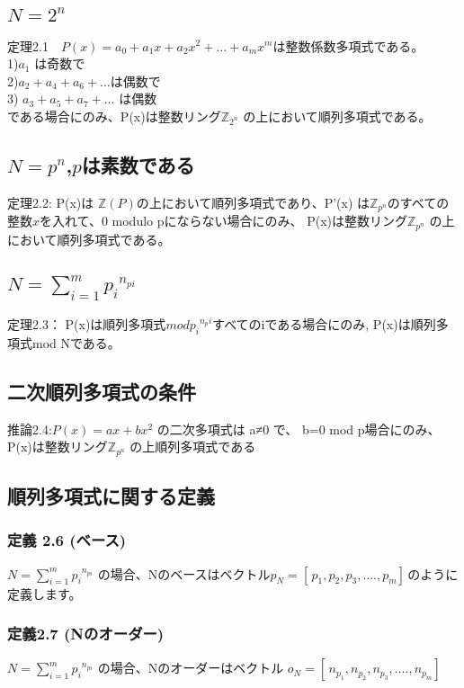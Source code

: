 \documentclass[20 pts]{article}
\begin{document}
\subsection{$N=2^n$}
定理2.1　$P(x)=a_0+a_1x+a_2x^2+…+a_mx^m $は整数係数多項式である。\\
1)$a_1$ は奇数で\\
2)$a_2+a_4+a_6+… $は偶数で　\\
3) $a_3+a_5+a_7+…$ は偶数\\
である場合にのみ、P(x)は整数リング$\mathbb{ Z}_{2^n}$ の上において順列多項式である。


\subsection{$N=p^n$,$p$は素数である}
定理2.2:  P(x)は $\mathbb{Z}(P)$の上において順列多項式であり、P'(x) は$\mathbb{Z}_{p^n}$のすべての整数$x$を入れて、0 modulo pにならない場合にのみ、 P(x)は整数リング$\mathbb{Z}_{p^n}$ の上において順列多項式である。

\subsection{$N=\sum_{i=1}^m {p_i}^{n_{pi}}$}
定理2.3： P(x)は順列多項式$mod{p_i}^{n_pi}$すべてのiである場合にのみ, P(x)は順列多項式mod Nである。

\subsection{二次順列多項式の条件 }
推論2.4:$P(x)=ax+bx^2$ の二次多項式は  a≠0 で、 b=0 mod p場合にのみ、P(x)は整数リング$\mathbb{Z}_{p^n}$ の上順列多項式である

\subsection{順列多項式に関する定義 }
\subsubsection{定義 2.6 (ベース)}
$N=\sum_{i=1}^m {p_i}^{n_{pi}}$ の場合、Nのベースはベクトル$p_N=[\,p_1,p_2,p_3,….,p_m]\, $のように定義します。

\subsubsection{定義2.7 (Nのオーダー)}
$N=\sum_{i=1}^m {p_i}^{n_{pi}}$ の場合、Nのオーダーはベクトル $o_N=[\,n_{p_1},n_{p_2},n_{p_3},….,n_{p_m}]\,$
\end{document}
